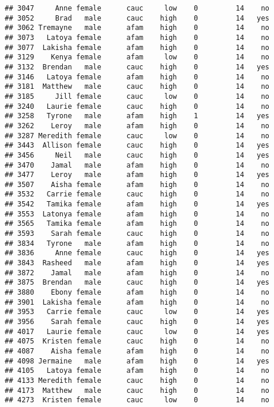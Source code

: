 \documentclass[
]{article}
\begin{document}
\begin{verbatim}
## 3047     Anne female      cauc     low    0         14    no
## 3052     Brad   male      cauc    high    0         14   yes
## 3062 Tremayne   male      afam    high    0         14    no
## 3073   Latoya female      afam    high    0         14    no
## 3077  Lakisha female      afam    high    0         14    no
## 3129    Kenya female      afam     low    0         14    no
## 3132  Brendan   male      cauc    high    0         14   yes
## 3146   Latoya female      afam    high    0         14    no
## 3181  Matthew   male      cauc    high    0         14    no
## 3185     Jill female      cauc     low    0         14    no
## 3240   Laurie female      cauc    high    0         14    no
## 3258   Tyrone   male      afam    high    1         14   yes
## 3262    Leroy   male      afam    high    0         14    no
## 3287 Meredith female      cauc     low    0         14    no
## 3443  Allison female      cauc    high    0         14   yes
## 3456     Neil   male      cauc    high    0         14   yes
## 3470    Jamal   male      afam    high    0         14    no
## 3477    Leroy   male      afam    high    0         14   yes
## 3507    Aisha female      afam    high    0         14    no
## 3532   Carrie female      cauc    high    0         14    no
## 3542   Tamika female      afam    high    0         14   yes
## 3553  Latonya female      afam    high    0         14    no
## 3565   Tamika female      afam    high    0         14    no
## 3593    Sarah female      cauc    high    0         14    no
## 3834   Tyrone   male      afam    high    0         14    no
## 3836     Anne female      cauc    high    0         14   yes
## 3843  Rasheed   male      afam    high    0         14   yes
## 3872    Jamal   male      afam    high    0         14    no
## 3875  Brendan   male      cauc    high    0         14   yes
## 3880    Ebony female      afam    high    0         14    no
## 3901  Lakisha female      afam    high    0         14    no
## 3953   Carrie female      cauc     low    0         14   yes
## 3956    Sarah female      cauc    high    0         14   yes
## 4017   Laurie female      cauc     low    0         14   yes
## 4075  Kristen female      cauc    high    0         14    no
## 4087    Aisha female      afam    high    0         14    no
## 4098 Jermaine   male      afam    high    0         14   yes
## 4105   Latoya female      afam    high    0         14    no
## 4133 Meredith female      cauc    high    0         14    no
## 4173  Matthew   male      cauc    high    0         14    no
## 4273  Kristen female      cauc     low    0         14    no

\end{verbatim}
\end{document}

